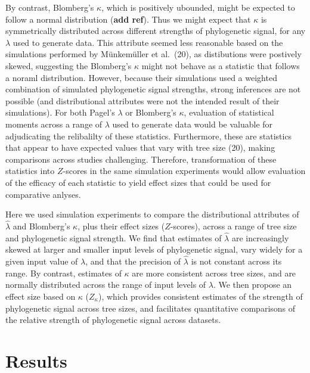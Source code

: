 \documentclass[
]{article}
\begin{document}
By contrast, Blomberg's \(\kappa\), which is positively ubounded, might
be expected to follow a normal distribution (\textbf{add ref}). Thus we
might expect that \(\kappa\) is symmetrically distributed across
different strengths of phylogenetic signal, for any \(\lambda\) used to
generate data. This attribute seemed less reasonable based on the
simulations performed by Münkemüller et al.~(20), as distibutions were
postively skewed, suggesting the Blomberg's \(\kappa\) might not behave
as a statistic that follows a noraml distribution. However, because
their simulations used a weighted combination of simulated phylogenetic
signal strengths, strong inferences are not possible (and distributional
attributes were not the intended result of their simulations). For both
Pagel's \(\lambda\) or Blomberg's \(\kappa\), evaluation of statistical
moments across a range of \(\lambda\) used to generate data would be
valuable for adjudicating the relibalilty of these statistics.
Furthermore, these are statistics that appear to have expected values
that vary with tree size (20), making comparisons across studies
challenging. Therefore, transformation of these statistics into
\(Z\)-scores in the same simulation experiments would allow evaluation
of the efficacy of each statistic to yield effect sizes that could be
used for comparative anlyses. \hfill\break

Here we used simulation experiments to compare the distributional
attributes of \(\hat{\lambda}\) and Blomberg's \(\kappa\), plus their
effect sizes (\(Z\)-scores), across a range of tree size and
phylogenetic signal strength. We find that estimates of
\(\hat{\lambda}\) are increasingly skewed at larger and smaller input
levels of phylogenetic signal, vary widely for a given input value of
\(\lambda\), and that the precision of \(\hat{\lambda}\) is not constant
across its range. By contrast, estimates of \(\kappa\) are more
consistent across tree sizes, and are normally distributed across the
range of input levels of \(\lambda\). We then propose an effect size
based on \(\kappa\) (\(Z_{\kappa}\)), which provides consistent
estimates of the strength of phylogenetic signal across tree sizes, and
facilitates quantitative comparisons of the relative strength of
phylogenetic signal across datasets.

\hypertarget{results}{%
\section{Results}\label{results}}
\end{document}
